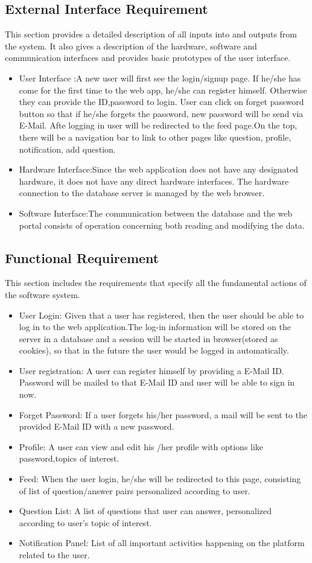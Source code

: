 \documentclass[12pt]{article}
\begin{document}
\subsection{External Interface Requirement}
This section provides a detailed description of all inputs into and outputs from the system. It also gives a description of the hardware, software and communication interfaces and provides basic prototypes of the user interface.
\begin{itemize}
\item User Interface :A new user will first see the login/signup page. If he/she has come for the first time to the web app, he/she can register himself. Otherwise they can provide the ID,password to login. User can click on forget password button so that if he/she forgets the password, new password will be send via E-Mail. Afte logging in user will be redirected to the feed page.On the top, there will be a navigation bar to link to other pages like question, profile, notification, add question.
\item Hardware Interface:Since the web application does not have any designated hardware, it does not have any direct hardware interfaces. The hardware connection to the database server is managed by the web browser.
\item Software Interface:The communication between the database and the web portal consists of operation concerning both reading and modifying the data.
\end{itemize}

\subsection{Functional Requirement}
This section includes the requirements that specify all the fundamental actions of the software system.
\begin{itemize}
\item User Login: Given that a user has registered, then the user should be able to log in to the web application.The log-in information will be stored on the server in a database and a session will be started in browser(stored as cookies), so that in the future the user would be logged in automatically.
\item User registration: A user can register himself by providing a E-Mail ID. Password will be mailed to that E-Mail ID and user will be able to sign in now.
\item Forget Password: If a user forgets his/her password, a mail will be sent to the provided E-Mail ID with a new password.
\item Profile: A user can view and edit his /her profile with options like password,topics of interest.
\item Feed: When the user login, he/she will be redirected to this page, consisting of list of question/answer pairs personalized according to user.
\item Question List: A list of questions that user can answer, personalized according to user's topic of interest.
\item Notification Panel: List of all important activities happening on the platform related to the user.
\end{itemize}
\end{document}

